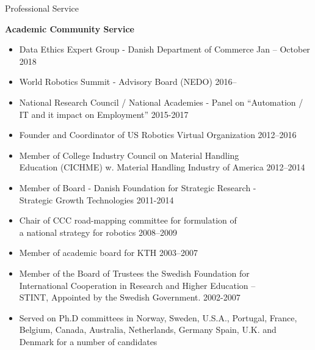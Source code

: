 \documentclass{article}
\begin{document}
\begin{cv}
\begin{cvlist}{Professional Service}%
\item {\bf Academic Community Service}
  \begin{itemize}
  \item Data Ethics Expert Group - Danish Department of Commerce \cftdotfill{\cftdotsep}
    Jan -- October 2018
  \item World Robotics Summit - Advisory Board (NEDO)
    \cftdotfill{\cftdotsep} 2016--
  \item National Research Council / National Academies - Panel on
    ``Automation / IT and it impact on Employment''
    \cftdotfill{\cftdotsep} 2015-2017
  \item Founder and Coordinator of US Robotics Virtual Organization
    \cftdotfill{\cftdotsep} 2012--2016
  \item Member of College Industry Council on Material Handling\\
    Education (CICHME) w. Material Handling Industry of America
    \cftdotfill{\cftdotsep} 2012--2014
  \item Member of Board - Danish Foundation for Strategic Research -\\
    Strategic Growth Technologies \cftdotfill{\cftdotsep} 2011-2014
  \item Chair of CCC road-mapping committee for formulation of \\
    a national strategy for robotics \cftdotfill{\cftdotsep}
    2008--2009
  \item Member of academic board for KTH \cftdotfill{\cftdotsep}
    2003--2007
  \item Member of the Board of Trustees the Swedish Foundation for\\
    International Cooperation in Research and Higher Education --\\
    STINT, Appointed by the Swedish Government.
    \cftdotfill{\cftdotsep} 2002-2007
  \item Served on Ph.D committees in Norway, Sweden, U.S.A., Portugal,
    France, Belgium, Canada, Australia, Netherlands, Germany Spain,
    U.K. and Denmark for a number of candidates
  \end{itemize}


\end{cvlist}
\end{cv}
\end{document}
